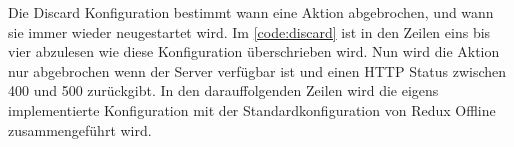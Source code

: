 \begin{center}
  
\end{center}
Die Discard Konfiguration bestimmt wann eine Aktion abgebrochen, und wann sie immer wieder neugestartet wird. Im \autoref{code:discard} ist in den Zeilen eins bis vier abzulesen wie diese Konfiguration überschrieben wird. Nun wird die Aktion nur abgebrochen wenn der Server verfügbar ist und einen \gls{HTTP} Status zwischen 400 und 500 zurückgibt.
In den darauffolgenden Zeilen wird die eigens implementierte Konfiguration mit der Standardkonfiguration von Redux Offline zusammengeführt wird.